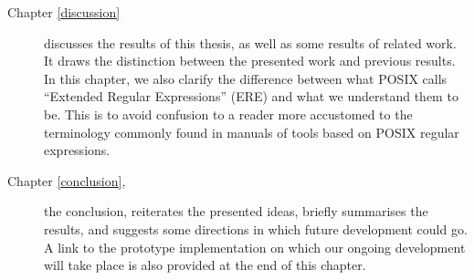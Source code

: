 \begin{description}
   \item[Chapter \ref{discussion}] discusses the results of this thesis, as well
      as some results of related work. It draws the distinction between the
      presented work and previous results. In this chapter, we also clarify the
      difference between what POSIX calls ``Extended Regular Expressions'' (ERE)
      and what we understand them to be. This is to avoid confusion to a reader
      more accustomed to the terminology commonly found in manuals of tools
      based on POSIX regular expressions.

   \item[Chapter \ref{conclusion},] the conclusion, reiterates the presented
      ideas, briefly summarises the results, and suggests some directions in
      which future development could go. A link to the prototype implementation
      on which our ongoing development will take place is also provided at the
      end of this chapter.

\end{description}



